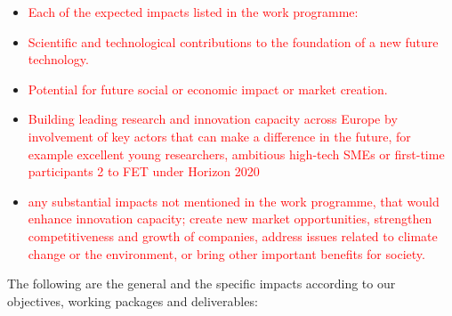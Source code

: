 \documentclass[12pt, a4paper]{article} %
\begin{document}
\begin{itemize}
\item \textcolor{red}{Each of the expected impacts listed in the work
    programme:}
\item \textcolor{red}{Scientific and technological contributions to
    the foundation of a new future technology.}
 \item \textcolor{red}{Potential for future social or economic impact
     or market creation.}
 \item \textcolor{red}{Building leading research and innovation
     capacity across Europe by involvement of key actors that can make
     a difference in the future, for example excellent young
     researchers, ambitious high-tech SMEs or first-time participants
     2 to FET under Horizon 2020}
 \item \textcolor{red}{any substantial impacts not mentioned in the
     work programme, that would enhance innovation capacity; create
     new market opportunities, strengthen competitiveness and growth
     of companies, address issues related to climate change or the
     environment, or bring other important benefits for society.}
  \end{itemize}


The following are the general and the specific impacts according to
our objectives, working packages and deliverables:
\end{document}
